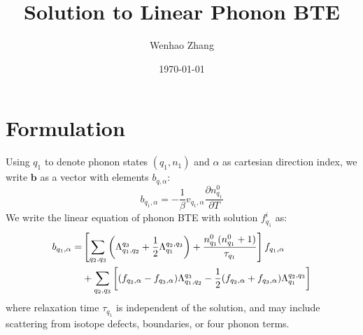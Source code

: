 \documentclass{article}
\newcommand{\pfrac}[2]{\frac{\partial #1}{\partial #2}}
\begin{document}
\title{Solution to Linear Phonon BTE}
\author{Wenhao Zhang}
\date{\today}
\maketitle

\section{Formulation}
Using $q_1$ to denote phonon states $(q_1,n_1)$ and $\alpha$ as cartesian direction index, 
we write $\mathbf{b}$ as a vector with elements $b_{q,\alpha}$:
\begin{equation}
    b_{q_1,\alpha} = - \frac{1}{\beta} v_{q_1,\alpha} \pfrac{n_{q_1}^0}{T}
\end{equation}
We write the linear equation of phonon BTE with solution $f_{q_1}^i$ as:
\begin{align}
    b_{q_1,\alpha} = 
    &\left[ \sum_{q_2,q_3} \left( \Lambda_{q_1,q_2}^{q_3} + \frac{1}{2} \Lambda_{q_1}^{q_2, q_3} \right) + \frac{n_{q_1}^0(n_{q_1}^0+1)}{\tau_{q_1}} \right] 
    f_{q_1,\alpha} \notag \\
    &+ \sum_{q_2,q_3} 
    \left[ (f_{q_2,\alpha} - f_{q_3,\alpha})\Lambda_{q_1,q_2}^{q_3} - \frac{1}{2} (f_{q_2,\alpha} + f_{q_3,\alpha}) \Lambda_{q_1}^{q_2, q_3} \right]
\end{align}
where relaxation time $\tau_{q_1}$ is independent of the solution, and may include scattering from 
isotope defects, boundaries, or four phonon terms.

\end{document}
